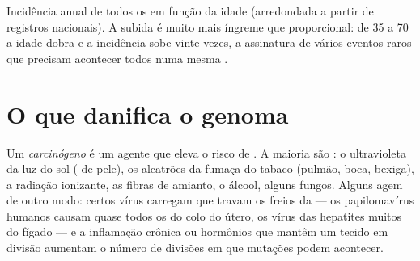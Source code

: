 \begin{omfigure}

{\small Incidência anual de todos os  em função da idade
(arredondada a partir de registros nacionais). A subida é muito mais
íngreme que proporcional: de 35 a 70 a idade dobra e a incidência sobe
vinte vezes, a assinatura de vários eventos raros que precisam
acontecer todos numa mesma .}
\end{omfigure}

\section{O que danifica o genoma}

\begin{definition}[Carcinógeno]\label{def:g11:cancer:carcinogen}
Um \emph{carcinógeno} é um agente que eleva o risco
de . A maioria são : o ultravioleta da luz do sol
( de pele), os alcatrões da fumaça do tabaco (pulmão, boca,
bexiga), a radiação ionizante, as fibras de amianto, o álcool, alguns
fungos. Alguns agem de outro modo: certos vírus carregam  que
travam os freios da  --- os papilomavírus humanos causam quase
todos os  do colo do útero, os vírus das hepatites muitos
 do fígado --- e a inflamação crônica ou hormônios que mantêm
um tecido em divisão aumentam o número de divisões em que mutações
podem acontecer.
\end{definition}

